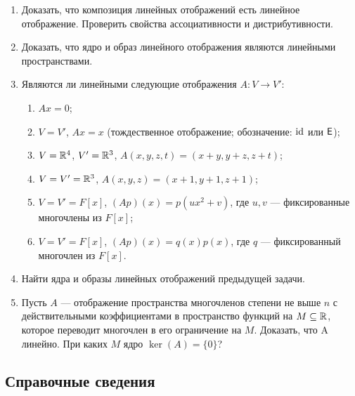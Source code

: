 \begin{enumerate}
\item  Доказать, что композиция линейных отображений есть линейное отображение. 
Проверить свойства ассоциативности и дистрибутивности.

\item Доказать, что ядро и образ линейного отображения являются
линейными пространствами.

\item Являются ли линейными следующие отображения $A:V\to V'$:
\begin{enumerate}
\item $Ax = 0$;
\item $V = V'$, $Ax = x$ (тождественное отображение; обозначение: $\mathrm{id}$ или $\mathsf{E}$);
\item $V = \mathbb R^4$, $V' = \mathbb R^3$, $A(x, y, z, t) = (x + y, y + z, z + t)$;
\item $V = V' = \mathbb R^3$, $A(x, y, z) = (x + 1, y + 1, z + 1)$;
\item $V = V' = F[x]$, $(Ap)(x) = p(ux^2 + v)$, где $u,v$ --- фиксированные многочлены из $F[x]$;
\item $V = V' = F[x]$, $(Ap)(x) = q(x)p(x)$, где $q$ --- фиксированный многочлен из $F[x]$.
\end{enumerate}

\item Найти ядра и образы линейных отображений предыдущей задачи.

\item Пусть $A$ --- отображение пространства многочленов степени не выше $n$
с действительными коэффициентами в пространство
функций на $M \subseteq \mathbb R$, которое переводит многочлен в его ограничение на $M$.
\ipunkt Доказать, что A линейно. \ipunkt При каких $M$ ядро $\ker(A) = \{0\}$?
\end{enumerate}


\setcounter{chapter}{70}

\subsection*{Справочные сведения}

